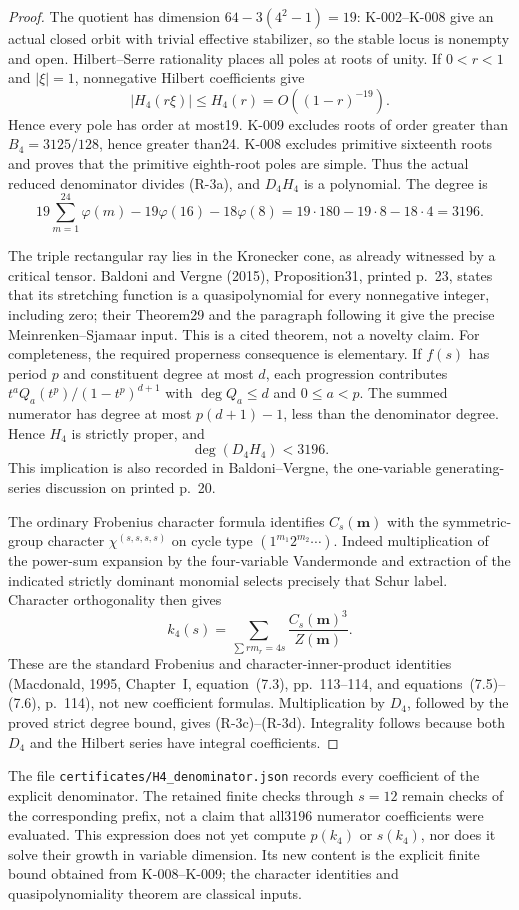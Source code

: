 \begin{proof}
The quotient has dimension $64-3(4^2-1)=19$: K-002--K-008
give an actual closed orbit with trivial effective stabilizer, so
the stable locus is nonempty and open. Hilbert--Serre rationality
places all poles at roots of unity. If $0<r<1$ and $|\xi|=1$,
nonnegative Hilbert coefficients give
\[
                  |H_4(r\xi)|\le H_4(r)=O((1-r)^{-19}).
\]
Hence every pole has order at most19. K-009 excludes roots of
order greater than $B_4=3125/128$, hence greater than24.
K-008 excludes primitive sixteenth roots and proves that the
primitive eighth-root poles are simple. Thus the actual reduced
denominator divides (R-3a), and $D_4H_4$ is a polynomial.
The degree is
\[
 19\sum_{m=1}^{24}\varphi(m)-19\varphi(16)-18\varphi(8)
       =19\cdot180-19\cdot8-18\cdot4=3196.
\]

The triple rectangular ray lies in the Kronecker cone, as already
witnessed by a critical tensor. Baldoni and Vergne (2015),
Proposition31, printed p.~23, states that its stretching function
is a quasipolynomial for every nonnegative integer, including zero;
their Theorem29 and the paragraph following it give the precise
Meinrenken--Sjamaar input. This is a cited theorem, not a novelty
claim. For completeness, the required properness consequence is
elementary. If $f(s)$ has period $p$ and constituent degree at most
$d$, each progression contributes
$t^aQ_a(t^p)/(1-t^p)^{d+1}$ with $\deg Q_a\le d$ and $0\le a<p$.
The summed numerator has degree at most $p(d+1)-1$, less than
the denominator degree. Hence $H_4$ is strictly proper, and
\[
                         \deg(D_4H_4)<3196.
\]
This implication is also recorded in Baldoni--Vergne, the
one-variable generating-series discussion on printed p.~20.

The ordinary Frobenius character formula identifies
$C_s(\mathbf m)$ with the symmetric-group character
$\chi^{(s,s,s,s)}$ on cycle type $(1^{m_1}2^{m_2}\cdots)$.
Indeed multiplication of the power-sum expansion by the four-variable
Vandermonde and extraction of the indicated strictly dominant
monomial selects precisely that Schur label. Character orthogonality
then gives
\[
                k_4(s)=\sum_{\sum rm_r=4s}
                       \frac{C_s(\mathbf m)^3}{Z(\mathbf m)}.
\]
These are the standard Frobenius and character-inner-product
identities (Macdonald, 1995, Chapter~I, equation~(7.3), pp.~113--114,
and equations~(7.5)--(7.6), p.~114), not new
coefficient formulas. Multiplication by $D_4$, followed by the
proved strict degree bound, gives (R-3c)--(R-3d). Integrality
follows because both $D_4$ and the Hilbert series have integral
coefficients.
\end{proof}

The file \texttt{certificates/H4\_denominator.json} records every
coefficient of the explicit denominator. The retained finite checks
through $s=12$ remain checks of the corresponding prefix, not a claim
that all3196 numerator coefficients were evaluated. This expression
does not yet compute $p(k_4)$ or $s(k_4)$, nor does it solve their
growth in variable dimension. Its new content is the explicit
finite bound obtained from K-008--K-009; the character identities
and quasipolynomiality theorem are classical inputs.
